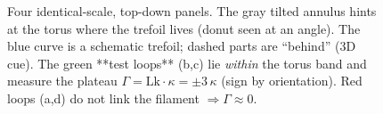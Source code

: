 \documentclass[11pt]{article}
\begin{document}
\begin{figure}[t]
{%
}

\hspace{0.9cm}
\hspace{0.9cm}
\hspace{0.9cm}

\caption{Four identical-scale, top-down panels. The gray tilted annulus hints at the torus where the trefoil lives (donut seen at an angle).
The blue curve is a schematic trefoil; dashed parts are “behind” (3D cue).
The green **test loops** (b,c) lie \emph{within} the torus band and measure the plateau \(\Gamma=\mathrm{Lk}\cdot\kappa=\pm 3\,\kappa\) (sign by orientation).
Red loops (a,d) do not link the filament \(\Rightarrow \Gamma\approx 0\).}
\label{fig:fourpanel-3D-cartoon}
\end{figure}




\end{document}
